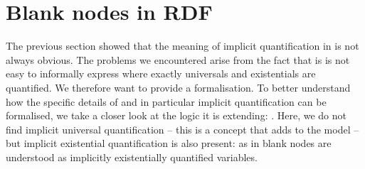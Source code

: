 \section{Blank nodes in RDF}
The previous section showed that the meaning of implicit quantification in \nthree is not always obvious. The problems we encountered arise from the fact 
that is is not easy to informally express where exactly universals and existentials are quantified. We therefore want to provide a formalisation.
To better understand how the specific details of \nthree and in particular implicit quantification 
can be formalised, we take a closer look at the logic it is extending: \rdf.
%
% 
Here, we do not find implicit universal quantification -- this is a concept that \nthreelogic adds to the \rdf 
model -- but implicit existential quantification 
is also present: as in \nthree blank nodes are understood as implicitly existentially quantified variables.

